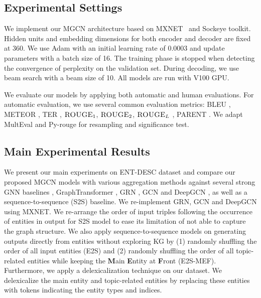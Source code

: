 \documentclass[11pt,a4paper]{article}
\begin{document}
\subsection{Experimental Settings}
We implement our MGCN architecture based on MXNET~\cite{chen2015mxnet} and Sockeye toolkit.
Hidden units and embedding dimensions for both encoder and decoder are fixed at 360. 
We use Adam \cite{kingma2014adam} with an initial learning rate of 0.0003 and update parameters with a batch size of 16. 
The training phase is stopped when detecting the convergence of perplexity on the validation set.
During decoding, we use beam search with a beam size of 10.
All models are run with V100 GPU.


We evaluate our models by applying both automatic and human evaluations.
For automatic evaluation, we use several common evaluation metrics: BLEU \cite{papineni2002bleu}, 
METEOR \cite{denkowski2011meteor}, TER \cite{snover2006study}, $\textsc{ROUGE}_1$, $\textsc{ROUGE}_2$, $\textsc{ROUGE}_L$ \cite{lin2004rouge}, PARENT \cite{dhingra2019handling}. We adapt MultEval \cite{clark2011better} and Py-rouge for resampling and significance test.








\subsection{Main Experimental Results}
We present our main experiments on ENT-DESC dataset and compare our proposed MGCN models with various aggregation methods against several strong GNN baselines \cite{bahdanau2014neural},  
GraphTransformer \cite{koncel2019text}, GRN \cite{beck2018graph}, GCN \cite{marcheggiani2018deep} and DeepGCN \cite{guo2019densely}, as well as a sequence-to-sequence (S2S) baseline.
We re-implement GRN, GCN and DeepGCN using MXNET.
We re-arrange the order of input triples following the occurrence of entities in output for S2S model to ease its limitation of not able to capture the graph structure.
We also apply sequence-to-sequence models on generating outputs directly from entities without exploring KG by (1) randomly shuffling the order of all input entities (E2S) and (2) randomly shuffling the order of all topic-related entities while keeping the \textbf{M}ain \textbf{E}ntity at \textbf{F}ront (E2S-MEF).
Furthermore, we apply a delexicalization technique on our dataset.
We delexicalize the main entity and topic-related entities by replacing these entities with tokens indicating the entity types and indices. 
\end{document}
